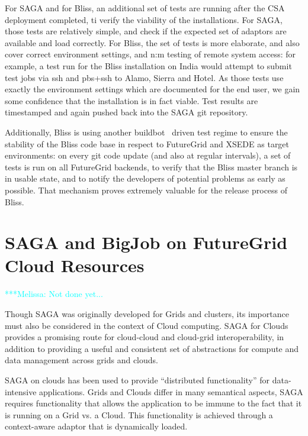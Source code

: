 \documentclass[]{paper}
\newcommand{\mrnote}[1]{ {\textcolor{cyan} { ***Melissa: #1 }}}
\newcommand{\mrnote}[1]{}
\begin{document}
For SAGA and for Bliss, an additional set of tests are running after
the CSA deployment completed, ti verify the viability of the
installations.  For SAGA, those tests are relatively simple, and check
if the expected set of adaptors are available and load correctly.  For
Bliss, the set of tests is more elaborate, and also cover correct
environment settings, and n:m testing of remote system access: for
example, a test run for the Bliss installation on India would attempt
to submit test jobs via ssh and pbs+ssh to Alamo, Sierra and Hotel.
As those tests use exactly the environment settings which are
documented for the end user, we gain some confidence that the
installation is in fact viable.  Test results are timestamped and
again pushed back into the SAGA git repository.

Additionally, Bliss is using another buildbot~\cite{bliss-builbot}
driven test regime to ensure the stability of the Bliss code base in
respect to FutureGrid and XSEDE as target environments: on every git
code update (and also at regular intervals), a set of tests is run on
all FutureGrid backends, to verify that the Bliss master branch is in
usable state, and to notify the developers of potential problems as
early as possible.  That mechanism proves extremely valuable for the
release process of Bliss.


\section{SAGA and BigJob on FutureGrid Cloud Resources}

\mrnote{Not done yet...}

Though SAGA was originally developed for Grids and clusters, its importance must also be considered in the context of Cloud computing. SAGA for Clouds provides a promising route for cloud-cloud and cloud-grid interoperability, in addition to providing a useful and consistent set of abstractions for compute and data management across grids and clouds.


SAGA on clouds has been used to provide %
``distributed functionality'' for data-intensive applications.
Grids and Clouds differ in many semantical aspects, SAGA requires functionality that allows the application to be immune to the fact that it is running on a Grid vs. a Cloud. This functionality is achieved through a context-aware adaptor that is dynamically loaded.
\end{document}
